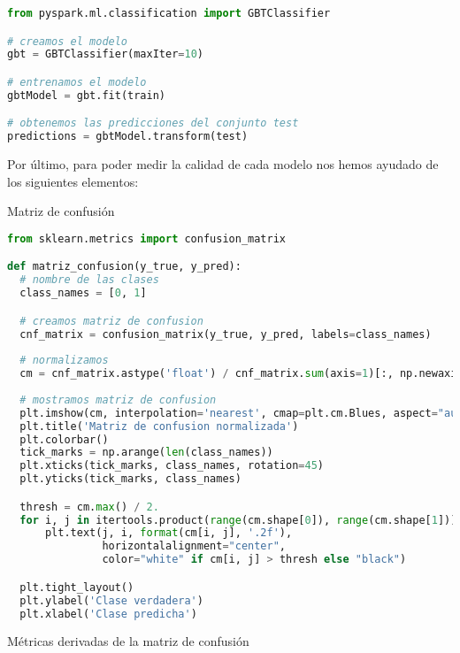 \begin{minipage}{\linewidth}
\begin{lstlisting}[language=Python, caption=Métricas derivadas de la matriz de confusión]
from pyspark.ml.classification import GBTClassifier

# creamos el modelo
gbt = GBTClassifier(maxIter=10)

# entrenamos el modelo
gbtModel = gbt.fit(train)

# obtenemos las predicciones del conjunto test
predictions = gbtModel.transform(test)
\end{lstlisting}
\end{minipage}  

Por último, para poder medir la calidad de cada modelo nos hemos ayudado de los siguientes elementos:

\begin{itemize}
\begin{minipage}{\linewidth}
    \item Matriz de confusión

\begin{lstlisting}[language=Python, caption=Matriz de confusión]
from sklearn.metrics import confusion_matrix

def matriz_confusion(y_true, y_pred):
  # nombre de las clases
  class_names = [0, 1]

  # creamos matriz de confusion
  cnf_matrix = confusion_matrix(y_true, y_pred, labels=class_names)
  
  # normalizamos
  cm = cnf_matrix.astype('float') / cnf_matrix.sum(axis=1)[:, np.newaxis]
  
  # mostramos matriz de confusion
  plt.imshow(cm, interpolation='nearest', cmap=plt.cm.Blues, aspect="auto")
  plt.title('Matriz de confusion normalizada')
  plt.colorbar()
  tick_marks = np.arange(len(class_names))
  plt.xticks(tick_marks, class_names, rotation=45)
  plt.yticks(tick_marks, class_names)

  thresh = cm.max() / 2.
  for i, j in itertools.product(range(cm.shape[0]), range(cm.shape[1])):
      plt.text(j, i, format(cm[i, j], '.2f'),
               horizontalalignment="center",
               color="white" if cm[i, j] > thresh else "black")

  plt.tight_layout()
  plt.ylabel('Clase verdadera')
  plt.xlabel('Clase predicha')
\end{lstlisting}
\end{minipage}  

\begin{minipage}{\linewidth}
    \item Métricas derivadas de la matriz de confusión


\end{minipage}
\end{itemize}

